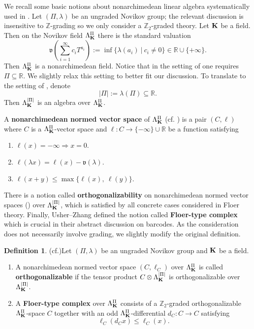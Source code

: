 \documentclass[reqno, 10pt]{amsart}
\numberwithin{equation}{section}
\numberwithin{equation}{section}
\renewcommand{\subset}{\subseteq}
\theoremstyle{definition}
\newtheorem{defn}[thm]{Definition}
\theoremstyle{remark}
\newcommand{\beq}{\begin{equation}}
\newcommand{\eeq}{\end{equation}}
\newcommand{\beqn}{\begin{equation*}}
\newcommand{\eeqn}{\end{equation*}}
\newcommand{\mb}{\mathbb}
\newcommand{\mf}{\mathfrak}
\begin{document}
We recall some basic notions about nonarchimedean linear algebra systematically used in \cite{Usher_Zhang_2016}. Let $(\Pi, \lambda)$ be an ungraded Novikov group; the relevant discussion is insensitive to ${\mb Z}$-grading so we only consider a ${\mb Z}_2$-graded theory. Let ${\bf K}$ be a field. Then on the Novikov field $\Lambda_{\bf K}^\Pi$ there is the standard valuation 
\beqn
{\mf v}\left( \sum_{i=1}^\infty c_i T^{a_i} \right):= \inf \Big\{ \lambda(a_i)\ |\ c_i \neq 0 \Big\} \in {\mb R} \cup \{+\infty \}.
\eeqn
Then $\Lambda_{\bf K}^\Pi$ is a nonarchimedean field. Notice that in the setting of \cite{Usher_Zhang_2016} one requires $\Pi \subset {\mb R}$. We slightly relax this setting to better fit our discussion. To translate to the setting of \cite{Usher_Zhang_2016}, denote
\beq\label{eqn:r-value}
|\Pi|:= \lambda(\Pi) \subset {\mb R}.
\eeq
Then $\Lambda_{\bf K}^{|\Pi|}$ is an algebra over $\Lambda_{{\bf K}}^{\Pi}$.

A {\bf nonarchimedean normed vector space} of $\Lambda_{\bf K}^\Pi$ (cf. \cite[Definition 2.2]{Usher_Zhang_2016}) is a pair $(C, \ell)$ where $C$ is a $\Lambda_{\bf K}^\Pi$-vector space and $\ell: C \to \{-\infty\} \cup {\mb R}$ be a function satisfying
\begin{enumerate}
    \item $\ell (x) = -\infty \Longrightarrow x = 0$.

    \item $\ell (\lambda x) = \ell (x) - {\mf v}(\lambda)$.

    \item $\ell (x + y)  \leq \max \{ \ell(x),\ \ell(y)\}$.
\end{enumerate}
There is a notion called {\bf orthogonalizability} on nonarchimedean normed vector spaces (\cite[Definition 2.10]{Usher_Zhang_2016}) over $\Lambda_{{\bf K}}^{|\Pi|}$, which is satisfied by all concrete cases considered in Floer theory. Finally, Usher--Zhang defined the notion called {\bf Floer-type complex} which is crucial in their abstract discussion on barcodes. As the consideration does not necessarily involve grading, we slightly modify the original definition.

\begin{defn}(cf.\cite[Definition 4.1]{Usher_Zhang_2016})\label{defn_Floer_type_complex} Let $(\Pi, \lambda)$ be an ungraded Novikov group and ${\bf K}$ be a field.
\begin{enumerate}

\item A nonarchimedean normed vector space $(C, \ell_C)$ over $\Lambda_{\bf K}^\Pi$ is called {\bf orthogonalizable} if the tensor product $C \otimes \Lambda_{\bf K}^{|\Pi|}$ is orthogonalizable over $\Lambda_{\bf K}^{|\Pi|}$. 

\item A {\bf Floer-type complex} over $\Lambda_{\bf K}^\Pi$ consists of a ${\mb Z}_2$-graded orthogonalizable $\Lambda_{\bf K}^\Pi$-space $C$ together with an odd $\Lambda_{\bf K}^\Pi$-differential $d_C: C \to C$ satisfying
\beqn
\ell_C(d_C x) \leq \ell_C(x).
\eeqn
\end{enumerate}
\end{defn}
\end{document}
